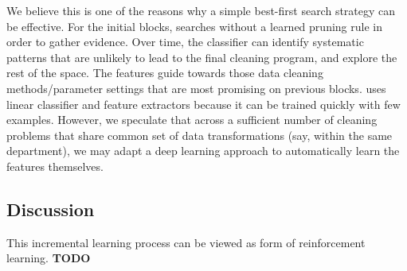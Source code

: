 We believe this is one of the reasons why a simple best-first search strategy can be effective.  For the initial blocks, \sys searches without a learned pruning rule in order to gather evidence.  Over time, the classifier can identify systematic patterns that are unlikely to lead to the final cleaning program, and explore the rest of the space.  
The features guide \sys towards those data cleaning methods/parameter settings that are most promising on previous blocks.
 \sys uses linear classifier and feature extractors because it can be trained quickly with few examples.   However, we speculate that across a sufficient number of cleaning problems that share common set of data transformations (say, within the same department), we may adapt a deep learning approach to automatically learn the features themselves. 
 
 \subsection{Discussion}
This incremental learning process can be viewed as form of reinforcement learning.
\textbf{TODO}









\iffalse
\stitle{Faster Data Quality Refinement}
\ewu{I emphasize this assuming the experiment exists!!!}
One benefit of learning a pruning model for {\it data transformations} rather than relation instances is that it can potentially be reused or fine-tuned for new, but structurally similar, data cleaning problems.  For instance, when users iteratively refine the data quality measure, the problem is largely the same, and \sys can intialize the search with the previously learned model.  This has the potential to learn  {\it across data cleaning problems} rather than across blocks within a single problem.   \ewu{We evaluate the benefits of re-using models during iterative refinement in Section~\ref{XXX}.}
\fi


 








